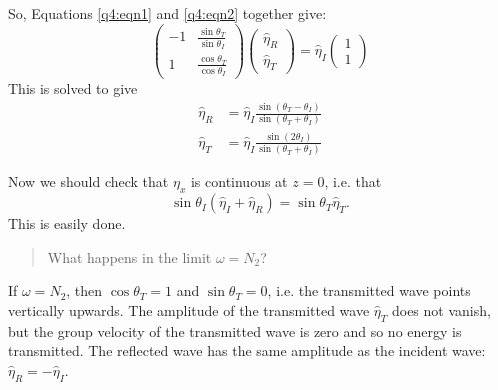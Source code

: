\documentclass{article}
\begin{document}
So, Equations \ref{q4:eqn1} and \ref{q4:eqn2} together give:
\begin{equation}
    \begin{pmatrix}
        -1 & \frac{\sin\theta_T}{\sin\theta_I} \\
        1 & \frac{\cos\theta_T}{\cos\theta_I}
    \end{pmatrix}
    \begin{pmatrix}
        \hat\eta_R \\ \hat\eta_T
    \end{pmatrix}
    =
\hat\eta_I\begin{pmatrix}1\\1\end{pmatrix}
\end{equation}
This is solved to give
\begin{align}
    \hat\eta_R &= \hat\eta_I\frac{\sin(\theta_T-\theta_I)}{\sin(\theta_T+\theta_I)} \\
    \hat\eta_T &= \hat\eta_I\frac{\sin(2\theta_I)}{\sin(\theta_T+\theta_I)}
\end{align}

Now we should check that $\eta_x$ is continuous at $z=0$, i.e. that 
\begin{equation}
    \sin\theta_I(\hat\eta_I+\hat\eta_R) = \sin\theta_T\hat\eta_T.
\end{equation}
This is easily done.

\begin{quote}
   What happens in the limit $\omega=N_2$?
\end{quote}
If $\omega=N_2$, then $\cos\theta_T=1$ and $\sin\theta_T=0$, i.e. the
transmitted wave points vertically upwards. The amplitude of the transmitted
wave $\hat\eta_T$ does not vanish, but the group velocity of the transmitted
wave is zero and so no energy is transmitted. The reflected wave has the same
amplitude as the incident wave: $\hat\eta_R = -\hat\eta_I$.
\end{document}
